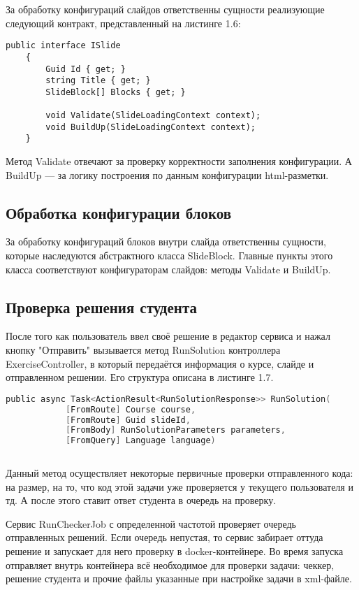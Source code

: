 За обработку конфигураций слайдов ответственны сущности реализующие следующий контракт, представленный на листинге 1.6:

\begin{lstlisting}[caption={Контракт конфигуратора слайдов}]
public interface ISlide
	{
		Guid Id { get; }
		string Title { get; }
		SlideBlock[] Blocks { get; }
		
		void Validate(SlideLoadingContext context);
		void BuildUp(SlideLoadingContext context);
	}
\end{lstlisting}

Метод Validate отвечают за проверку корректности заполнения конфигурации.
А BuildUp — за логику построения по данным конфигурации html-разметки.


\subsection{Обработка конфигурации блоков}
За обработку конфигураций блоков внутри слайда ответственны сущности, которые наследуются абстрактного класса SlideBlock. Главные пункты этого класса соответствуют конфигураторам слайдов: методы Validate и BuildUp.

\subsection{Проверка решения студента}

После того как пользователь ввел своё решение в редактор сервиса и нажал кнопку "Отправить"     вызывается метод RunSolution контроллера ExerciseController, в который передаётся информация о курсе, слайде и отправленном решении. Его структура описана в листинге 1.7.

\begin{lstlisting}[language={C}, caption={Сигнатура метода RunSolution}]
public async Task<ActionResult<RunSolutionResponse>> RunSolution(
			[FromRoute] Course course, 
			[FromRoute] Guid slideId,
			[FromBody] RunSolutionParameters parameters,
			[FromQuery] Language language)
			
\end{lstlisting}

Данный метод осуществляет некоторые первичные проверки отправленного кода: на размер, на то, что код этой задачи уже проверяется у текущего пользователя и тд. А после этого ставит ответ студента в очередь на проверку.

Сервис RunCheckerJob с определенной частотой проверяет очередь отправленных решений. Если очередь непустая, то сервис забирает оттуда решение и запускает для него проверку в docker-контейнере. Во время запуска отправляет внутрь контейнера всё необходимое для проверки задачи: чеккер, решение студента и прочие файлы указанные при настройке задачи в xml-файле.

